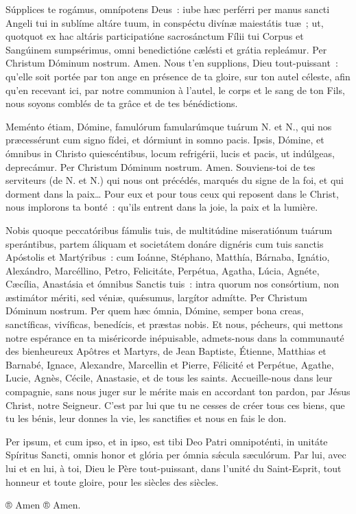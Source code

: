 \begin{paracol}{2}
\LigneParacol{0cm}
{Súpplices te rogámus, omnípotens De\-us~: iube hæc perférri per manus sancti Angeli tui in sublíme altáre tuum, in conspéctu divínæ maiestátis tuæ~; ut, quotquot ex hac altáris participatióne sacrosánctum Fílii tui Corpus et Sangúinem sumpsérimus, omni benedictióne cælésti et grátia repleámur. Per Christum Dóminum nostrum. Amen.}
{Nous t'en supplions, Dieu tout-puis\-sant~: qu'elle soit portée par ton ange en présence de ta gloire, sur ton autel céleste, afin qu'en recevant ici, par notre communion à l'autel, le corps et le sang de ton Fils, nous soyons comblés de ta grâce et de tes bénédictions.}

\LigneParacol{0cm}
{Meménto étiam, Dómine, famulórum famularúmque tuárum {\color{rougeliturgique}N.} et {\color{rougeliturgique}N.}, qui nos præcessérunt cum signo fídei, et dórmiunt in somno pacis. Ipsis, Dómine, et ómnibus in Christo quiescéntibus, locum refrigérii, lucis et pacis, ut indúlgeas, deprecámur. Per Christum Dóminum nostrum. Amen.}
{Souviens-toi de tes serviteurs (de {\color{rougeliturgique}N.} et {\color{rougeliturgique}N.}) qui nous ont précédés, marqués du signe de la foi, et qui dorment dans la paix… Pour eux et pour tous ceux qui reposent dans le Christ, nous implorons ta bonté~: qu'ils entrent dans la joie, la paix et la lumière.}

\LigneParacol{0cm}
{Nobis quoque peccatóribus fámulis tuis, de multitúdine miseratiónum tuárum sperántibus, partem áliquam et societátem donáre dignéris cum tuis sanctis Apóstolis et Martýribus~: cum Ioánne, Stéphano, Matthía, Bárnaba, Ignátio, Alexándro, Marcéllino, Petro, Felicitáte, Perpétua, Agatha, Lúcia, Agnéte, Cæcília, Anastásia et ómnibus Sanctis tuis~: intra quorum nos consórtium, non æstimátor mériti, sed véniæ, quǽsumus, largítor admítte. Per Christum Dóminum nostrum. Per quem hæc ómnia, Dómine, semper bona creas, sanctíficas, vivíficas, benedícis, et præstas nobis.}
{Et nous, pécheurs, qui mettons notre espérance en ta miséricorde inépuisable, admets-nous dans la communauté des bienheureux Apôtres et Martyrs, de Jean Baptiste, Étienne, Matthias et Barnabé, Ignace, Alexandre, Marcellin et Pierre, Félicité et Perpétue, Agathe, Lucie, Agnès, Cécile, Anastasie, et de tous les saints. Accueille-nous dans leur compagnie, sans nous juger sur le mérite mais en accordant ton pardon, par Jésus Christ, notre Seigneur. C'est par lui que tu ne cesses de créer tous ces biens, que tu les bénis, leur donnes la vie, les sanctifies et nous en fais le don.}

\LigneParacol{0cm}
{Per ipsum, et cum ipso, et in ipso, est tibi Deo Patri omnipoténti, in unitáte Spíritus Sancti, omnis honor et glória per ómnia sǽcula sæculórum.}
{Par lui, avec lui et en lui, à toi, Dieu le Père tout-puissant, dans l'unité du Saint-Esprit, tout honneur et toute gloire, pour les siècles des siècles.}

\LigneParacol{0cm}
{® Amen}
{® Amen.}

\end{paracol}
